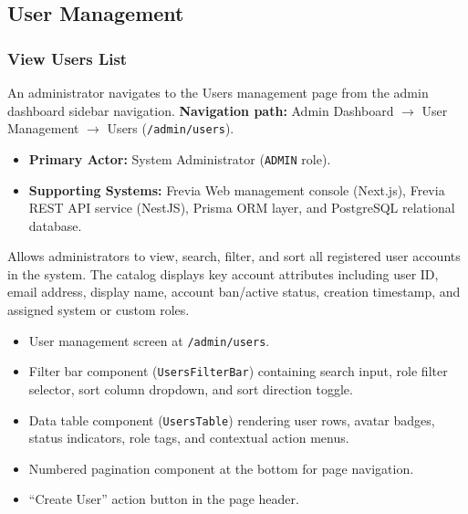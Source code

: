 
\subsection{User Management}

\subsubsection{ View Users List}

An administrator navigates to the Users management page from the admin dashboard sidebar navigation.\newline
\textbf{Navigation path:} Admin Dashboard $\rightarrow$ User Management $\rightarrow$ Users (\texttt{/\allowbreak{}admin/\allowbreak{}users}).


\begin{itemize}[leftmargin=1.6em,topsep=3pt,itemsep=2pt,parsep=0pt,label=$\bullet$]
    \item \textbf{Primary Actor:} System Administrator (\texttt{ADMIN} role).
    \item \textbf{Supporting Systems:} Frevia Web management console (Next.js), Frevia REST API service (NestJS), Prisma ORM layer, and PostgreSQL relational database.
\end{itemize}

\noindent Allows administrators to view, search, filter, and sort all registered user accounts in the system. The catalog displays key account attributes including user ID, email address, display name, account ban/active status, creation timestamp, and assigned system or custom roles.

\begin{itemize}[leftmargin=1.6em,topsep=3pt,itemsep=2pt,parsep=0pt,label=$\bullet$]
    \item User management screen at \texttt{/admin/users}.
    \item Filter bar component (\texttt{UsersFilterBar}) containing search input, role filter selector, sort column dropdown, and sort direction toggle.
    \item Data table component (\texttt{UsersTable}) rendering user rows, avatar badges, status indicators, role tags, and contextual action menus.
    \item Numbered pagination component at the bottom for page navigation.
    \item ``Create User'' action button in the page header.
\end{itemize}

